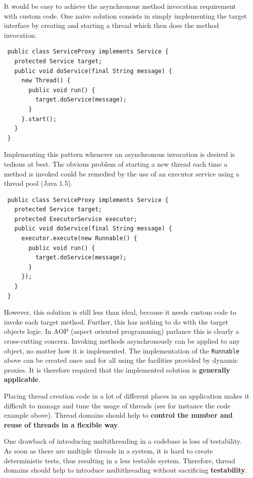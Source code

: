 It would be easy to achieve the asynchronous method invocation requirement
with custom code. One naive solution consists in simply implementing the target
interface by creating and starting a thread which then does the method
invocation.

\small{\begin{verbatim}
 public class ServiceProxy implements Service {
   protected Service target;
   public void doService(final String message) {
     new Thread() {
       public void run() {
         target.doService(message);
       }
     }.start();
   }
 }
\end{verbatim}}

Implementing this pattern whenever an asynchronous invocation is desired
is tedious at best. The obvious problem of starting a new thread
each time a method is invoked could be remedied by the use of an
executor service using a thread pool (Java 1.5).

\small{\begin{verbatim}
 public class ServiceProxy implements Service {
   protected Service target;
   protected ExecutorService executor;
   public void doService(final String message) {
     executor.execute(new Runnable() {
       public void run() {
         target.doService(message);
       }
     });
   }
 }
\end{verbatim}}

However, this solution is still less than ideal, because it needs custom code
to invoke each target method. Further, this has nothing to do with the
target objects logic. In AOP (aspect oriented programming) parlance this
is clearly a cross-cutting concern. Invoking methods asynchronously can 
be applied to any object, no matter how it is implemented. The implementation
of the \texttt{Runnable} above can be created once and for all using the
facilities provided by dynamic proxies. It is therefore
required that the implemented solution is \textbf{generally applicable}.

Placing thread creation code in a lot of different places in an application
makes it difficult to manage and tune the usage of threads (see for instance
the code example above). Thread domains should help to \textbf{control the
number and reuse of threads in a flexible way}.

One drawback of introducing multithreading in a codebase is loss of
testability. As soon as there are multiple threads in a system, it is
hard to create deterministic tests, thus resulting in a less testable
system. Therefore, thread domains should help to introduce multithreading
without sacrificing \textbf{testability}.


